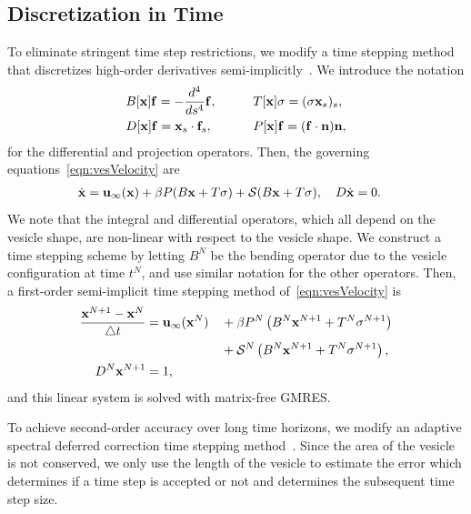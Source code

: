 \documentclass[9pt,twocolumn,twoside,lineno]{pnas-new}
\begin{document}
\subsection*{Discretization in Time}
To eliminate stringent time step restrictions, we modify a time stepping
method that discretizes high-order derivatives
semi-implicitly~\cite{vee-gue-zor-bir2009}. We introduce the notation
\begin{alignat}{3}
  &B[\mathbf{x}]\mathbf{f} = -\frac{d^4}{ds^4} \mathbf{f},  \qquad
  &&T[\mathbf{x}]\sigma = (\sigma \mathbf{x}_s)_s, \\
  &D[\mathbf{x}]\mathbf{f} = \mathbf{x}_s \cdot \mathbf{f}_s, 
  &&P[\mathbf{x}]\mathbf{f} = (\mathbf{f} \cdot \mathbf{n}) \mathbf{n},
\end{alignat}
for the differential and projection operators. Then, the
governing equations~\eqref{eqn:vesVelocity} are
\begin{align}
  \dot{\mathbf{x}} &= \mathbf{u}_\infty(\mathbf{x}) + \beta P(B\mathbf{x} + T\sigma)
  + \mathcal{S} (B\mathbf{x} + T\sigma), \quad
  D \dot{\mathbf{x}} = 0.
\end{align}
We note that the integral and differential operators, which all depend
on the vesicle shape, are non-linear with respect to the vesicle
shape. We construct a time stepping scheme by letting $B^N$ be the
bending operator due to the vesicle configuration at time $t^N$, and use
similar notation for the other operators. Then, a first-order
semi-implicit time stepping method of~\eqref{eqn:vesVelocity} is
\begin{alignat}{3}  
  \frac{\mathbf{x}^{N+1} - \mathbf{x}^N}{\triangle t} &= \mathbf{u}_\infty(\mathbf{x}^N) 
  &&+ \beta P^N\left(B^N\mathbf{x}^{N+1} + T^N\sigma^{N+1}\right) \nonumber \\
  & &&+ \mathcal{S}^N\left(B^N\mathbf{x}^{N+1} + T^N\sigma^{N+1}\right),  \\
  D^N\mathbf{x}^{N+1} &= 1,
\end{alignat}
and this linear system is solved with matrix-free GMRES.

To achieve second-order accuracy over long time horizons, we modify an
adaptive spectral deferred correction time stepping
method~\cite{qua-bir2016}. Since the area of the vesicle is not
conserved, we only use the length of the vesicle to estimate the error
which determines if a time step is accepted or not and determines the
subsequent time step size.

\end{document}
